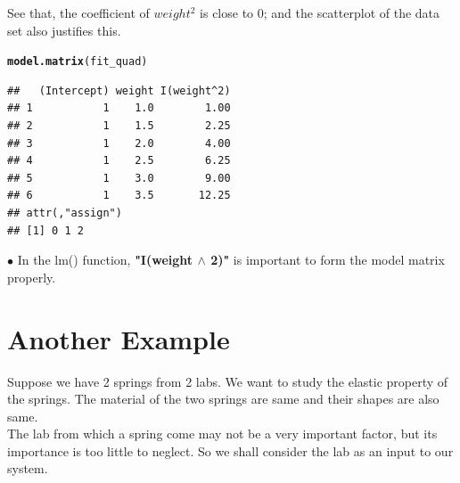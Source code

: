 \documentclass[11pt, a4paper]{article}\usepackage[]{graphicx}\usepackage[]{xcolor}
\makeatletter
\newcommand{\hlstd}[1]{\textcolor[rgb]{0.345,0.345,0.345}{#1}}%
\newcommand{\hlkwd}[1]{\textcolor[rgb]{0.737,0.353,0.396}{\textbf{#1}}}%
\newenvironment{kframe}{%
 \def\at@end@of@kframe{}%
 \ifinner\ifhmode%
  \def\at@end@of@kframe{\end{minipage}}%
  \begin{minipage}{\columnwidth}%
 \fi\fi%
 \def\FrameCommand##1{\hskip\@totalleftmargin \hskip-\fboxsep
 \colorbox{shadecolor}{##1}\hskip-\fboxsep
     \hskip-\linewidth \hskip-\@totalleftmargin \hskip\columnwidth}%
 \MakeFramed {\advance\hsize-\width
   \@totalleftmargin\z@ \linewidth\hsize
   \@setminipage}}%
 {\par\unskip\endMakeFramed%
 \at@end@of@kframe}
\newenvironment{knitrout}{}{} %
\makeatother
\begin{document}
See that, the coefficient of $weight^2$ is close to 0; and the scatterplot of the data set also justifies this.

\begin{knitrout}
\color{fgcolor}\begin{kframe}
\begin{alltt}
\hlkwd{model.matrix}\hlstd{(fit_quad)}
\end{alltt}
\begin{verbatim}
##   (Intercept) weight I(weight^2)
## 1           1    1.0        1.00
## 2           1    1.5        2.25
## 3           1    2.0        4.00
## 4           1    2.5        6.25
## 5           1    3.0        9.00
## 6           1    3.5       12.25
## attr(,"assign")
## [1] 0 1 2
\end{verbatim}
\end{kframe}
\end{knitrout}

$\bullet$ In the lm() function, \textbf{"I(weight $\wedge$ 2)"} is important to form the model matrix properly.


\newpage

\section*{Another Example}

Suppose we have 2 springs from 2 labs. We want to study the elastic property of the springs. The material of the two springs are same and their shapes are also same.\\

The lab from which a spring come may not be a very important factor, but its importance is too little to neglect. So we shall consider the lab as an input to our system. \\
\end{document}
